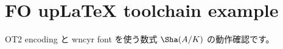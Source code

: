 \documentclass[uplatex,dvipdfmx]{jsarticle}
\begin{document}
\section*{FO upLaTeX toolchain example}

OT2 encoding と wncyr font を使う数式 $\Sha(A/K)$ の動作確認です。
\end{document}
